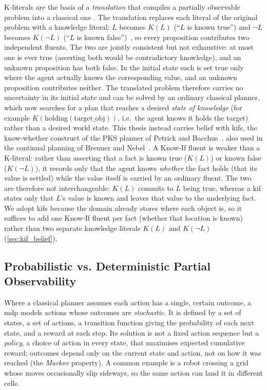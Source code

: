 K-literals are the basis of a \emph{translation} that compiles a partially observable problem into a classical one \cite{geffner2013concise}. The translation replaces each literal of the original problem with a knowledge literal: $L$ becomes $K(L)$ (``$L$ is known true'') and $\neg L$ becomes $K(\neg L)$ (``$L$ is known false'')~\cite{palacios2006compiling}, so every proposition contributes two independent fluents. The two are jointly consistent but not exhaustive: at most one is ever true (asserting both would be contradictory knowledge), and an unknown proposition has both false. In the initial state each is set true only where the agent actually knows the corresponding value, and an unknown proposition contributes neither. The translated problem therefore carries no uncertainty in its initial state and can be solved by an ordinary classical planner, which now searches for a plan that reaches a desired \emph{state of knowledge} (for example $K(\text{holding}(\text{target\_obj}))$, i.e.\ the agent knows it holds the target) rather than a desired world state. This thesis instead carries belief with \acp{kif}, the know-whether construct of the PKS planner of Petrick and Bacchus~\cite{petrick2002planning}, also used in the continual planning of Brenner and Nebel~\cite{brenner2009continual}. A Know-If fluent is weaker than a K-literal: rather than asserting that a fact is known true ($K(L)$) or known false ($K(\neg L)$), it records only that the agent knows \emph{whether} the fact holds (that its value is settled) while the value itself is carried by an ordinary fluent. The two are therefore not interchangeable: $K(L)$ commits to $L$ being true, whereas a \ac{kif} states only that $L$'s value is known and leaves that value to the underlying fact. We adopt \acp{kif} because the domain already stores where each object is, so it suffices to add one Know-If fluent per fact (whether that location is known) rather than two separate knowledge literals $K(L)$ and $K(\neg L)$ (\cref{sec:kif_belief}).

\subsection{Probabilistic vs. Deterministic Partial Observability}
Where a classical planner assumes each action has a single, certain outcome, a \ac{mdp} \cite{geffner2013concise} models actions whose outcomes are \emph{stochastic}. It is defined by a set of states, a set of actions, a transition function giving the probability of each next state, and a reward at each step. Its solution is not a fixed action sequence but a \emph{policy}, a choice of action in every state, that maximises expected cumulative reward; outcomes depend only on the current state and action, not on how it was reached (the \emph{Markov} property). A common example is a robot crossing a grid whose moves occasionally slip sideways, so the same action can land it in different cells.

